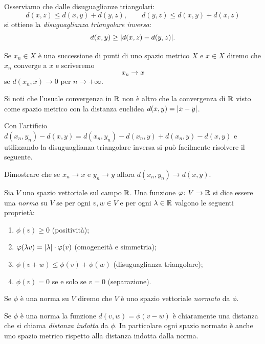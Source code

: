 Osserviamo che dalle disuguaglianze triangolari:
\[
  d(x,z) \le d(x,y) + d(y,z), \qquad
  d(y,z) \le d(x,y) + d(x,z)
\]
si ottiene la \emph{disuguaglianza triangolare inversa}:
\[
  d(x,y) \ge {\left|d(x,z) - d(y,z)\right|}.
\]

\begin{definition}[convergenza]%
  \label{def:convergenza_metrica}%
\mymark{*}%
Se $x_n \in X$ è una successione di punti di uno spazio metrico $X$
e $x\in X$ diremo che $x_n$ converge a $x$ e scriveremo
\[
  x_n \to x
\]
se $d(x_n,x)\to 0$ per $n\to +\infty$.
\end{definition}

Si noti che l'usuale convergenza in ${\mathbb R}$ non è altro
che la convergenza di ${\mathbb R}$
visto come spazio metrico con la distanza euclidea $d(x,y) = {\left|x-y\right|}$.

Con l'artificio $d(x_n,y_n) - d(x,y) = d(x_n,y_n) - d(x_n,y) + d(x_n,y) - d(x,y)$
e utilizzando la disuguaglianza triangolare inversa si può
facilmente risolvere il seguente.

\begin{exercise}
Dimostrare che se $x_n\to x$ e $y_n\to y$
allora $d(x_n,y_n) \to d(x,y)$.
\end{exercise}

\begin{definition}
\mymark{*}
\label{def:norma}
Sia $V$ uno spazio vettoriale sul campo ${\mathbb R}$.
Una funzione $\varphi \colon V\to {\mathbb R}$ si
dice essere una \emph{norma}%
%
 su $V$ se
per ogni $v,w\in V$ e per ogni $\lambda \in {\mathbb R}$
valgono le seguenti proprietà:
\begin{enumerate}
\item
  $\phi(v) \ge 0$ (positività);
\item
  $\varphi(\lambda v) = {\left|\lambda\right|} \cdot \varphi(v)$ (omogeneità e simmetria);
\item
  $\phi(v+w) \le \phi(v) + \phi(w)$
  (disuguaglianza triangolare);
\item
  $\phi(v)=0$ se e solo se $v=0$ (separazione).
\end{enumerate}

Se $\phi$ è una norma su $V$ diremo che
$V$
è uno spazio vettoriale \emph{normato}%
%
 da $\phi$.

Se $\phi$ è una norma la funzione $d(v,w) = \phi(v-w)$
è chiaramente una distanza che si chiama
\emph{distanza indotta}
%
%
da $\phi$.
In particolare ogni spazio normato è anche uno spazio metrico rispetto alla
distanza indotta dalla norma.
\end{definition}

